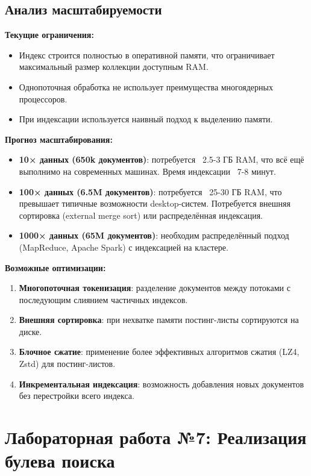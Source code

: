 \documentclass[a4paper,12pt]{article}
\begin{document}
\subsection{Анализ масштабируемости}

\textbf{Текущие ограничения:}
\begin{itemize}
    \item Индекс строится полностью в оперативной памяти, что ограничивает максимальный размер коллекции доступным RAM.
    \item Однопоточная обработка не использует преимущества многоядерных процессоров.
    \item При индексации используется наивный подход к выделению памяти.
\end{itemize}

\textbf{Прогноз масштабирования:}
\begin{itemize}
    \item \textbf{10× данных (650k документов)}: потребуется ~2.5-3 ГБ RAM, что всё ещё выполнимо на современных машинах. Время индексации ~7-8 минут.
    \item \textbf{100× данных (6.5M документов)}: потребуется ~25-30 ГБ RAM, что превышает типичные возможности desktop-систем. Потребуется внешняя сортировка (external merge sort) или распределённая индексация.
    \item \textbf{1000× данных (65M документов)}: необходим распределённый подход (MapReduce, Apache Spark) с индексацией на кластере.
\end{itemize}

\textbf{Возможные оптимизации:}
\begin{enumerate}
    \item \textbf{Многопоточная токенизация}: разделение документов между потоками с последующим слиянием частичных индексов.
    \item \textbf{Внешняя сортировка}: при нехватке памяти постинг-листы сортируются на диске.
    \item \textbf{Блочное сжатие}: применение более эффективных алгоритмов сжатия (LZ4, Zstd) для постинг-листов.
    \item \textbf{Инкрементальная индексация}: возможность добавления новых документов без перестройки всего индекса.
\end{enumerate}

\section{Лабораторная работа №7: Реализация булева поиска}
\end{document}
